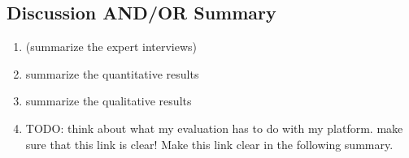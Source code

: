 




\subsection{Discussion AND/OR Summary}


	\begin{enumerate}
	\item (summarize the expert interviews)
	\item summarize the quantitative results
	\item summarize the qualitative results 
	\item TODO: think about what my evaluation has to do with my platform. make sure that this link is clear! Make this link clear in the following summary.
	\end{enumerate}


